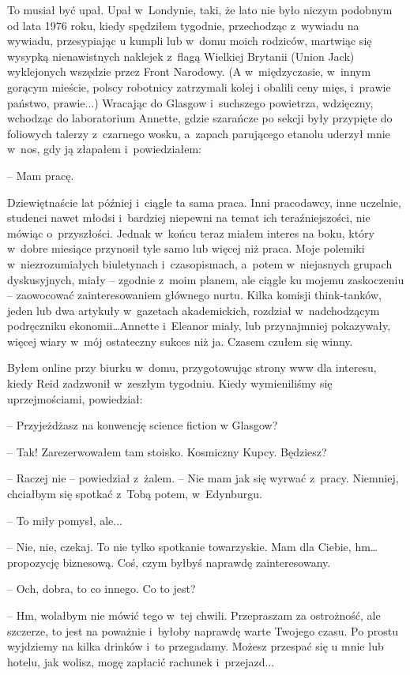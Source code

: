 \documentclass[oneside,polish,11pt,sfheadings]{mwbk}
\begin{document}
To musiał być upał. Upał w~Londynie, taki, że lato nie było niczym
podobnym od lata 1976 roku, kiedy spędziłem tygodnie, przechodząc z~wywiadu na wywiadu, przesypiając u kumpli lub w~domu moich rodziców,
martwiąc się wysypką nienawistnych naklejek z~flagą Wielkiej Brytanii
(Union Jack) wyklejonych wszędzie przez Front Narodowy. (A w~międzyczasie, w~innym gorącym mieście, polscy robotnicy zatrzymali kolej
i obalili ceny mięs, i~prawie państwo, prawie...) Wracając do Glasgow i~suchszego powietrza, wdzięczny, wchodząc do laboratorium Annette, gdzie
szarańcze po sekcji były przypięte do foliowych talerzy z~czarnego
wosku, a~zapach parującego etanolu uderzył mnie w~nos, gdy ją złapałem i~powiedziałem: 

-- Mam pracę.

Dziewiętnaście lat później i~ciągle ta sama praca. Inni pracodawcy, inne
uczelnie, studenci nawet młodsi i~bardziej niepewni na temat ich
teraźniejszości, nie mówiąc o~przyszłości. Jednak w~końcu teraz miałem
interes na boku, który w~dobre miesiące przynosił tyle samo lub więcej
niż praca. Moje polemiki w~niezrozumiałych biuletynach i~czasopismach, a~potem w~niejasnych grupach dyskusyjnych, miały -- zgodnie z~moim planem,
ale ciągle ku mojemu zaskoczeniu -- zaowocować zainteresowaniem głównego
nurtu. Kilka komisji think-tanków, jeden lub dwa artykuły w~gazetach
akademickich, rozdział w~nadchodzącym podręczniku ekonomii\ldots Annette i~Eleanor miały, lub przynajmniej pokazywały, więcej wiary w~mój
ostateczny sukces niż ja. Czasem czułem się winny.

Byłem online przy biurku w~domu, przygotowując strony www dla interesu,
kiedy Reid zadzwonił w~zeszłym tygodniu. Kiedy wymieniliśmy się
uprzejmościami, powiedział: 

-- Przyjeżdżasz na konwencję science fiction
w Glasgow?

-- Tak! Zarezerwowałem tam stoisko. Kosmiczny Kupcy. Będziesz?

-- Raczej nie -- powiedział z~żalem. -- Nie mam jak się wyrwać z~pracy.
Niemniej, chciałbym się spotkać z~Tobą potem, w~Edynburgu.

-- To miły pomysł, ale...

-- Nie, nie, czekaj. To nie tylko spotkanie towarzyskie. Mam dla Ciebie,
hm\ldots propozycję biznesową. Coś, czym byłbyś naprawdę zainteresowany.

-- Och, dobra, to co innego. Co to jest?

-- Hm, wolałbym nie mówić tego w~tej chwili. Przepraszam za ostrożność,
ale szczerze, to jest na poważnie i~byłoby naprawdę warte Twojego czasu.
Po prostu wyjdziemy na kilka drinków i~to przegadamy. Możesz przespać
się u mnie lub hotelu, jak wolisz, mogę zapłacić rachunek i~przejazd...
\end{document}
